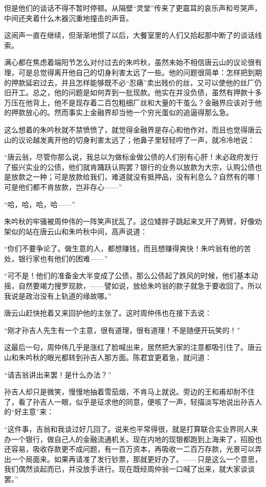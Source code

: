\par 但是他们的谈话不得不暂时停顿。从隔壁“灵堂”传来了更震耳的哀乐声和号哭声，中间还夹着什么木器沉重地撞击的声音。
\par 这闹声一直在继续，但渐渐地惯了以后，大餐室里的人们又拾起那中断了的谈话线索。
\par 满心都在焦虑着端阳节怎么对付过去的朱吟秋，虽然未始不相信唐云山的议论很有理，可是总觉得离开他自己的切身利害太远了一些。他的问题很简单：怎样把到期的押款延宕过去，并且怎样能够既不必“忍痛”卖出贱价的丝，又可以使他的丝厂仍旧开工。总之，他的问题是如何弄到一批现款。他实在并没负债，虽然有押款十多万压在他背上，他不是现存着二百包粗细厂丝和大量的干茧么？金融界应该对于他的押款放心的。然而事实上金融界却当他一个穷光蛋似的追逼得那么急。
\par 这么想着的朱吟秋就不禁愤愤了，就觉得金融界是存心和他作对，而且也觉得唐云山的议论越发离开他的切身利害太远了；他鼻子里轻轻哼了一声，就冷冷地说：
\par “唐云翁，尽管你那么说，我总以为做标金做公债的人们别有心肝！未必政府发行了振兴实业的公债，他们就肯踊跃认购罢？银行的业务以放款为大宗，认购公债也是放款之一种；可是放款给我们，难道就没有抵押品，没有利息么？自然有的哪！可是他们都不肯放款，岂非存心——”
\par “哈，哈，哈，哈——”
\par 朱吟秋的牢骚被周仲伟的一阵笑声扰乱了。这位矮胖子跳起来叉开了两臂，好像劝架似的站在唐云山和朱吟秋中间，高声说道：
\par “你们不要争论了。做生意的人，都想赚钱，而且想赚得爽快！朱吟翁有他的苦处，银行家也有他们的困难——”
\par “可不是！他们的准备金大半变成了公债，那么公债起了跌风的时候，他们基本动摇，自然要竭力搜罗现款，——譬如说，放给朱吟翁的款子就急于要收回了。所以我说是政治没有上轨道的缘故哪。”
\par 唐云山赶快抢着又来回护他的主张了。这时周仲伟也在接下去说：
\par “刚才孙吉人先生有一个主意，很有道理，很有道理！不是随便开玩笑的！”
\par 这最后一句，周仲伟几乎是涨红了脸喊出来，居然把大家的注意都吸引住了。唐云山和朱吟秋的眼光都转到孙吉人那方面。陈君宜更着急，就问道：
\par “请吉翁讲出来罢！是什么办法？”
\par 孙吉人却只是微笑，慢慢地抽着雪茄烟，不肯马上就说。旁边的王和甫却耐不住了，看了孙吉人一眼，似乎是征求他的同意，便咳了一声，轻描淡写地说出孙吉人的“好主意”来：
\par “这件事，吉翁和我谈过好几回了。说来也平常得很，就是打算联合实业界同人来办一个银行，做自己人的金融流通机关。现在内地的现银都跑到上海来了，招股也还容易，吸收存款更不成问题，有一百万资本，再吸收一二百万存款，光景可以弄出一个局面来。如果再请准了发行钞票，那就更好办了。——只是这么一个意思，我们偶然谈起而已，并没放手进行。现在既经周仲翁一口喊了出来，就大家谈谈罢。”
